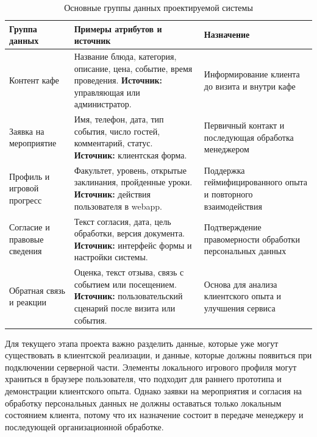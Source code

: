 \begin{table}[H]
\centering
\small
\caption{Основные группы данных проектируемой системы}
\label{tab:v2_data_groups}
\begin{tabularx}{\textwidth}{|>{\raggedright\arraybackslash}p{}|>{\raggedright\arraybackslash}p{}|>{\raggedright\arraybackslash}X|}
\hline
\textbf{Группа данных} & \textbf{Примеры атрибутов и источник} & \textbf{Назначение} \\ \hline
Контент кафе & Название блюда, категория, описание, цена, событие, время проведения. \newline \textbf{Источник:} управляющая или администратор. & Информирование клиента до визита и внутри кафе \\ \hline
Заявка на мероприятие & Имя, телефон, дата, тип события, число гостей, комментарий, статус. \newline \textbf{Источник:} клиентская форма. & Первичный контакт и последующая обработка менеджером \\ \hline
Профиль и игровой прогресс & Факультет, уровень, открытые заклинания, пройденные уроки. \newline \textbf{Источник:} действия пользователя в webapp. & Поддержка геймифицированного опыта и повторного взаимодействия \\ \hline
Согласие и правовые сведения & Текст согласия, дата, цель обработки, версия документа. \newline \textbf{Источник:} интерфейс формы и настройки системы. & Подтверждение правомерности обработки персональных данных \\ \hline
Обратная связь и реакции & Оценка, текст отзыва, связь с событием или посещением. \newline \textbf{Источник:} пользовательский сценарий после визита или события. & Основа для анализа клиентского опыта и улучшения сервиса \\ \hline
\end{tabularx}
\normalsize
\end{table}

Для текущего этапа проекта важно разделить данные, которые уже могут существовать в клиентской реализации, и данные, которые должны появиться при подключении серверной части. Элементы локального игрового профиля могут храниться в браузере пользователя, что подходит для раннего прототипа и демонстрации клиентского опыта. Однако заявки на мероприятия и согласия на обработку персональных данных не должны оставаться только локальным состоянием клиента, потому что их назначение состоит в передаче менеджеру и последующей организационной обработке.

